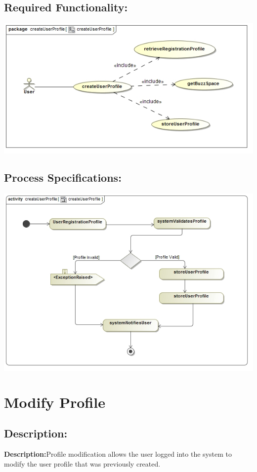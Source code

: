 \documentclass[a4paper,11pt]{article}
\begin{document}
\subsection{Required Functionality:} 
\includegraphics[width=1\linewidth]{./Images/UserProfile/CreateUserProfileUseCase}
\subsection{Process Specifications:} 
\includegraphics[width=1\linewidth]{./Images/UserProfile/CreateUserProfileActivity}

\section{Modify Profile}
\subsection*{Description:}
\textbf{Description:}Profile modification allows the user logged into the system to modify the user profile that was previously created.
\end{document}
